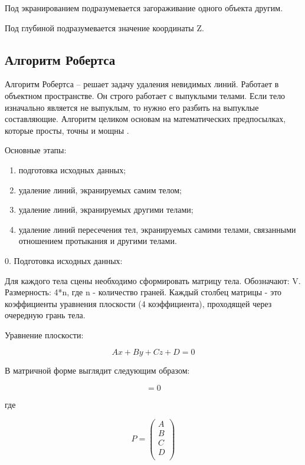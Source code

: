Под экранированием подразумевается загораживание одного объекта другим.

Под глубиной подразумевается значение координаты Z.

\subsection{Алгоритм Робертса}

Алгоритм Робертса -- решает задачу удаления невидимых линий. Работает в объектном пространстве. Он строго работает с выпуклыми телами. Если тело изначально является не выпуклым, то нужно его разбить на выпуклые составляющие. Алгоритм целиком основам на математических предпосылках, которые просты, точны и мощны \cite{tr1}.

Основные этапы:
\begin{enumerate}
	\item подготовка исходных данных;
	\item удаление линий, экранируемых самим телом;
	\item удаление линий, экранируемых другими телами;
	\item удаление линий пересечения тел, экранируемых самими телами, связанными отношением протыкания и другими телами.
\end{enumerate}

0. Подготовка исходных данных:

Для каждого тела сцены необходимо сформировать матрицу тела. Обозначают: V. Размерность: 4*n, где n - количество граней. Каждый столбец матрицы - это коэффициенты уравнения плоскости (4 коэффициента), проходящей через очередную грань тела.

Уравнение плоскости:

\begin{equation}
	Ax + By + Cz + D = 0
\end{equation}

В матричной форме выглядит следующим образом:

\begin{equation}
	[x\;y\;z\;1][P] = 0
\end{equation}

где

\begin{equation}
	P = \left(
	\begin{array}{c}
			A \\
			B \\
			C \\
			D \\
		\end{array}
	\right)
\end{equation}

